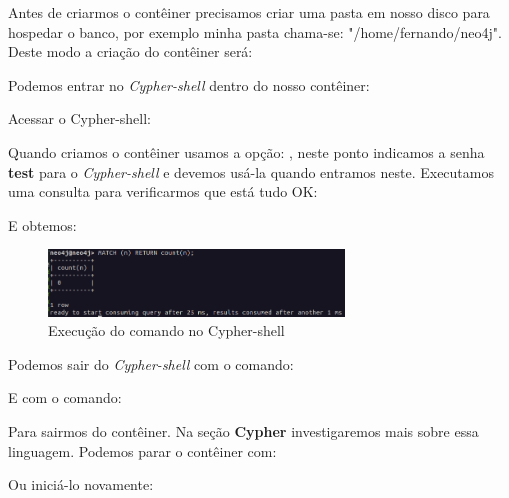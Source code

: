 \documentclass[a4paper,11pt]{article}
\begin{document}
Antes de criarmos o contêiner precisamos criar uma pasta em nosso disco para hospedar o banco, por exemplo minha pasta chama-se: "/home/fernando/neo4j". Deste modo a criação do contêiner será: \\

Podemos entrar no \textit{Cypher-shell} dentro do nosso contêiner: \\

Acessar o Cypher-shell: \\

Quando criamos o contêiner usamos a opção: , neste ponto indicamos a senha \textbf{test} para o \textit{Cypher-shell} e devemos usá-la quando entramos neste. Executamos uma consulta para verificarmos que está tudo OK: \\

E obtemos:
\begin{figure}[H]
	\centering
	\includegraphics[width=0.7\textwidth]{imagens/cyphershell}
	\caption{Execução do comando no Cypher-shell}
\end{figure}

Podemos sair do \textit{Cypher-shell} com o comando: \\

E com o comando: \\

Para sairmos do contêiner. Na seção \textbf{Cypher} investigaremos mais sobre essa linguagem. Podemos parar o contêiner com: \\

Ou iniciá-lo novamente: \\
\end{document}
